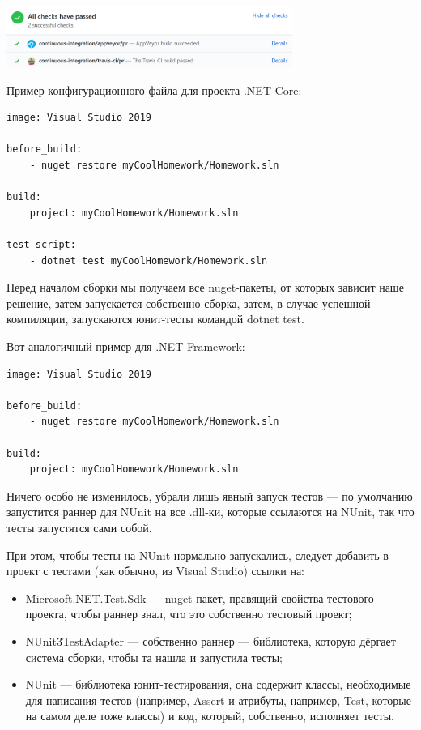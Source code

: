 \documentclass[a5paper]{article}
\begin{document}
\begin{center}
	\includegraphics[width=0.7\textwidth]{appVeyorSuccess.png}
\end{center}

Пример конфигурационного файла для проекта .NET Core:

\begin{verbatim}
image: Visual Studio 2019

before_build: 
    - nuget restore myCoolHomework/Homework.sln

build: 
    project: myCoolHomework/Homework.sln

test_script: 
    - dotnet test myCoolHomework/Homework.sln
\end{verbatim}

Перед началом сборки мы получаем все nuget-пакеты, от которых зависит наше решение, затем запускается собственно сборка, затем, в случае успешной компиляции, запускаются юнит-тесты командой dotnet test.

Вот аналогичный пример для .NET Framework:

\begin{verbatim}
image: Visual Studio 2019

before_build: 
    - nuget restore myCoolHomework/Homework.sln

build: 
    project: myCoolHomework/Homework.sln
\end{verbatim}

Ничего особо не изменилось, убрали лишь явный запуск тестов --- по умолчанию запустится раннер для NUnit на все .dll-ки, которые ссылаются на NUnit, так что тесты запустятся сами собой.

При этом, чтобы тесты на NUnit нормально запускались, следует добавить в проект с тестами (как обычно, из Visual Studio) ссылки на:
\begin{itemize}
	\item Microsoft.NET.Test.Sdk --- nuget-пакет, правящий свойства тестового проекта, чтобы раннер знал, что это собственно тестовый проект;
	\item NUnit3TestAdapter --- собственно раннер --- библиотека, которую дёргает система сборки, чтобы та нашла и запустила тесты;
	\item NUnit --- библиотека юнит-тестирования, она содержит классы, необходимые для написания тестов (например, Assert и атрибуты, например, Test, которые на самом деле тоже классы) и код, который, собственно, исполняет тесты.
\end{itemize}
\end{document}
